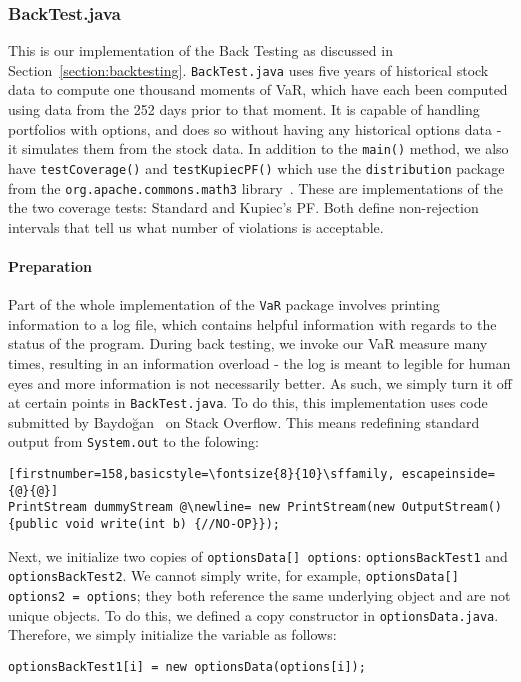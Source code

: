 \documentclass[../Dissertation.tex]{subfiles}
\begin{document}
\subsubsection{BackTest.java}

This is our implementation of the Back Testing as discussed in Section~\ref{section:backtesting}.
\lstinline|BackTest.java| uses five years of historical stock data to compute one thousand moments of VaR, which have each been computed using data from the 252 days prior to that moment.
It is capable of handling portfolios with options, and does so without having any historical options data - it simulates them from the stock data.
In addition to the \lstinline|main()| method, we also have \lstinline|testCoverage()| and \lstinline|testKupiecPF()| which use the \lstinline|distribution| package from the \lstinline|org.apache.commons.math3| library~\cite{Apache:Math3}.
These are implementations of the the two coverage tests: Standard and Kupiec's PF.
Both define non-rejection intervals that tell us what number of violations is acceptable.

\paragraph{Preparation}

Part of the whole implementation of the \lstinline|VaR| package involves printing information to a log file, which contains helpful information with regards to the status of the program.
During back testing, we invoke our VaR measure many times, resulting in an information overload - the log is meant to legible for human eyes and more information is not necessarily better.
As such, we simply turn it off at certain points in \lstinline|BackTest.java|. 
To do this, this implementation uses code submitted by Baydoğan~\cite{Baydoğan:2011} on Stack Overflow.
This means redefining standard output from \lstinline|System.out| to the folowing:
\begin{lstlisting}[firstnumber=158,basicstyle=\fontsize{8}{10}\sffamily, escapeinside={@}{@}]
PrintStream dummyStream @\newline= new PrintStream(new OutputStream() {public void write(int b) {//NO-OP}});
\end{lstlisting}

Next, we initialize two copies of \lstinline|optionsData[] options|: \lstinline|optionsBackTest1| and \lstinline|optionsBackTest2|.
We cannot simply write, for example, \lstinline|optionsData[] options2 = options|; they both reference the same underlying object and are not unique objects.
To do this, we defined a copy constructor in \lstinline|optionsData.java|.
Therefore, we simply initialize the variable as follows:
\begin{lstlisting}[firstnumber = 171]
optionsBackTest1[i] = new optionsData(options[i]);
\end{lstlisting}
\end{document}
